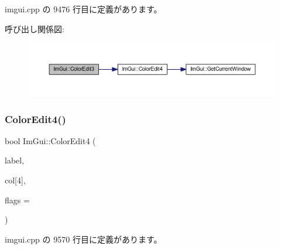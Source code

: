  imgui.\+cpp の 9476 行目に定義があります。

呼び出し関係図\+:\nopagebreak
\begin{figure}[H]
\begin{center}
\leavevmode
\includegraphics[width=350pt]{namespace_im_gui_a5afe76ba1c91f07363e40396e7df656e_cgraph}
\end{center}
\end{figure}
\mbox{\label{namespace_im_gui_ac3f45e2aa0b1d591cc8a2cdf8b566a45}} 
\subsubsection{\texorpdfstring{Color\+Edit4()}{ColorEdit4()}}
{\footnotesize\ttfamily bool Im\+Gui\+::\+Color\+Edit4 (\begin{DoxyParamCaption}\item[{const char $\ast$}]{label,  }\item[{float}]{col\mbox{[}4\mbox{]},  }\item[{\mbox{\hyperlink{imgui_8h_a6b2d5e95adc38f22c021252189f669c6}{Im\+Gui\+Color\+Edit\+Flags}}}]{flags = {} }\end{DoxyParamCaption})}



 imgui.\+cpp の 9570 行目に定義があります。

